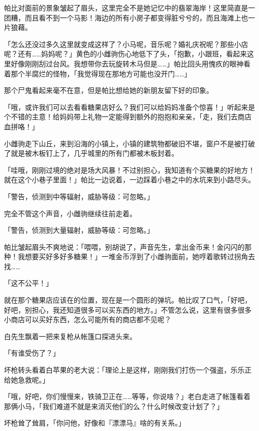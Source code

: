 帕比对面前的景象皱起了眉头，这里完全不是她记忆中的翡翠海岸！这里简直是一团糟，而且看不到一个马影！海边的所有小房子都变得脏兮兮的，而且海滩上也一片狼藉。

「怎么还没过多久这里就变成这样了？小马呢，音乐呢？婚礼庆祝呢？那些小店呢？还有……妈妈呢？」黄色的小雌驹伤心地低下了头，「抱歉，小跟班，看起来这里好像刚刚刮过台风。我想带你去玩旋转木马但是……」帕比回头用愧疚的眼神看着那个半腐烂的怪物，「我觉得现在那地方可能也没开门……」

那个尸鬼看起来毫不在意，但是帕比想给她的新朋友留下好的印象。

「哦，或许我们可以去看看糖果店好么？我们可以给妈妈准备个惊喜！」听起来是个不错的主意！给妈妈带上礼物一定能得到额外的抱抱和亲亲，「走，我们去商店血拼咯！」

小雌驹走下山丘，来到沿海的小镇上，小镇的建筑物都破旧不堪，窗户不是被打破了就是被木板钉上了，几乎城里的所有门都被木板封着。

「哇哦，刚刚过境的绝对是场大风暴！不过别担心，我知道有个买糖果的好地方！就在这个小巷子里面！」帕比一边说着，一边踩着小巷之中的水坑来到小路尽头。

「{\mtzh 警告，侦测到中等辐射，威胁等级：可忽略。}」

完全不管这个声音，小雌驹继续往前走着。

「{\mtzh 警告，侦测到大量辐射，威胁等级：可忽略。}」

帕比皱起眉头不爽地说：「喂喂，别胡说了，声音先生，拿出金币来！金闪闪的那种！我想要买好多好多糖果！」一堆金币浮到了小雌驹面前，她哼着歌转过拐角去找……


「这不公平！」

就在那个糖果店应该在的位置，现在是一个圆形的弹坑。帕比叹了口气，「好吧，好吧，别担心，我还知道很多可以买东西的地方。」不管怎么说，这里有很多很多小商店可以买好东西，怎么可能所有的商店都不见呢？

\horizonline


白先生飘着一把来复枪从帐篷口探进头来。

「有谁受伤了？」

坏枪转头看着白苹果的老大说：「理论上是这样，刚刚我们打伤一个强盗，乐乐正给她急救呢。」

「哦，好吧，你们慢慢来，铁骑卫正在……等等，你说啥？」老白走进了帐篷看着那俩小马，「我们难道不就是来消灭他们的么？什么时候改变计划了？」

坏枪耸了耸肩，「你问他，好像和『漂漂马』啥的有关系。」

